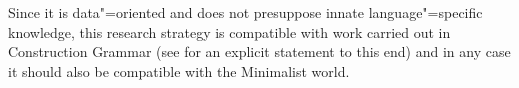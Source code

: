 Since it is data"=oriented and does not presuppose innate language"=specific knowledge, this research strategy is compatible with work carried out in Construction Grammar (see
\citealp[]{Goldberg2013b} for an explicit statement to this end) and in any case it should also be compatible with the Minimalist
world.








